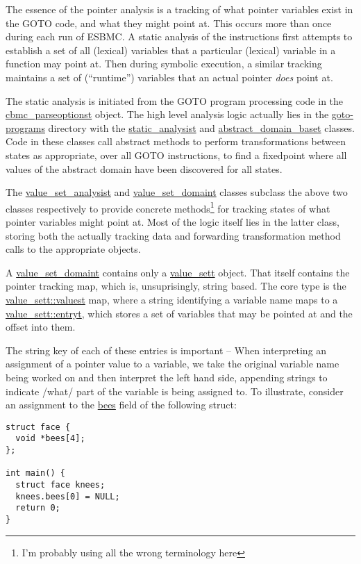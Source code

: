\documentclass{article}
\begin{document}
The essence of the pointer analysis is a tracking of what pointer variables
exist in the GOTO code, and what they might point at. This occurs more than once
during each run of ESBMC. A static analysis of the instructions first attempts
to establish a set of all (lexical) variables that a particular (lexical)
variable in a function may point at. Then during symbolic execution, a similar
tracking maintains a set of (``runtime'') variables that an actual pointer
\textit{does} point at.

The static analysis is initiated from the GOTO program processing code in the
\url{cbmc_parseoptionst} object. The high level analysis logic actually
lies in the \url{goto-programs} directory with the
\url{static_analysist} and \url{abstract_domain_baset}
classes. Code in these classes call abstract methods to perform transformations
between states as appropriate, over all GOTO instructions, to find a fixedpoint
where all values of the abstract domain have been discovered for all states.

The \url{value_set_analysist} and \url{value_set_domaint} classes
subclass the above two classes respectively to provide concrete
methods\footnote{I'm probably using all the wrong terminology here} for
tracking states of what pointer variables might point at. Most of the logic
itself lies in the latter class, storing both the actually tracking data
and forwarding transformation method calls to the appropriate objects.

A \url{value_set_domaint} contains only a \url{value_sett} object.
That itself contains the pointer tracking map, which is, unsuprisingly,
string based. The core type is the \url{value_sett::valuest} map,
where a string identifying a variable name maps to a
\url{value_sett::entryt}, which stores a set of variables that may be
pointed at and the offset into them.

The string key of each of these entries is important -- When interpreting
an assignment of a pointer value to a variable, we take the original variable
name being worked on and then interpret the left hand side, appending strings
to indicate /what/ part of the variable is being assigned to. To illustrate,
consider an assignment to the \url{bees} field of the following struct:
\begin{lstlisting}
struct face {
  void *bees[4];
};

int main() {
  struct face knees;
  knees.bees[0] = NULL;
  return 0;
}
\end{lstlisting}
\end{document}
